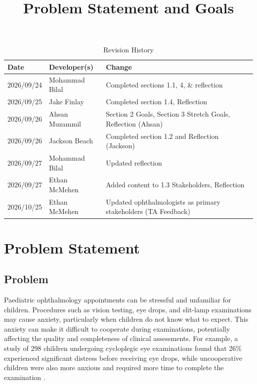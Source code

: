 \documentclass{article}
\title{Problem Statement and Goals\\\progname}
\author{\authname}
\date{}
\begin{document}
\maketitle

\newpage{}

\begin{table}[hp]
\caption{Revision History} \label{TblRevisionHistory}
\begin{tabularx}{\textwidth}{llX}
\toprule
\textbf{Date} & \textbf{Developer(s)} & \textbf{Change}\\
\midrule
2026/09/24 & Mohammad Bilal & Completed sections 1.1, 4, \& reflection \\
2026/09/25 & Jake Finlay & Completed section 1.4, Reflection \\
2026/09/26 & Ahsan Muzammil & Section 2 Goals, Section 3 Stretch Goals, Reflection (Ahsan) \\
2026/09/26 & Jackson Beach & Completed section 1.2 and Reflection (Jackson) \\
2026/09/27 & Mohammad Bilal & Updated reflection \\
2026/09/27 & Ethan McMehen & Added content to 1.3 Stakeholders, Reflection \\
2026/10/25 & Ethan McMehen & Updated ophthalmologists as primary stakeholders (TA Feedback) \\
\bottomrule
\end{tabularx}
\end{table}

\newpage{}

\section{Problem Statement}

\subsection{Problem}

Paediatric ophthalmology appointments can be stressful and unfamiliar for children.
Procedures such as vision testing, eye drops, and slit-lamp examinations may cause anxiety, particularly when children do not know what to expect.
This anxiety can make it difficult to cooperate during examinations, potentially affecting the quality and completeness of clinical assessments.
For example, a study of 298 children undergoing cycloplegic eye examinations found that 26\% experienced significant distress before receiving eye drops,
while uncooperative children were also more anxious and required more time to complete the examination \cite{ChiaEtAl2015}.
\end{document}

